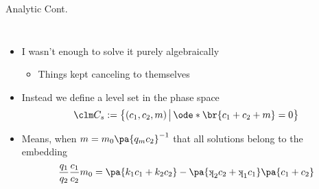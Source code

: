 \documentclass[aspectratio=169,  notheorems, sOuRcEs]{RUCPresentation}
\def\k{\raisebox{1ex}{\rotatebox{180}{k}}}
\begin{document}
\begin{frame}{Analytic Cont.}


    \begin{columns}[T]
        \column{0.6\framewidth}
        \begin{itemize}
            \item I wasn't  enough to
                solve it purely algebraically
                \begin{itemize}
                    \item Things kept canceling to themselves
                \end{itemize}
            \item<2-> Instead we define a level set in the phase space
                \begin{equation*}
                    \clm C_s:= \left\{(c_1, c_2, m) \,\big|\,
                    \ode* \br{c_1+c_2+m} = 0\right\}
                \end{equation*}
            \item<3-> Means, when \(m=m_0\pa{q_m c_2}^{-1}\) that all solutions
                belong to the embedding
                \begin{equation*}
                    {q_1 \over q_2} {c_1 \over c_2} m_0 =
                    \pa{k_1 c_1 + k_2 c_2}
                    - \pa{ \k_2  c_2 + \k_1  c_1 }  \pa{c_1 + c_2}
                \end{equation*}

        \end{itemize}


        \column{0.5\framewidth}

    \end{columns}

\end{frame}
\end{document}
